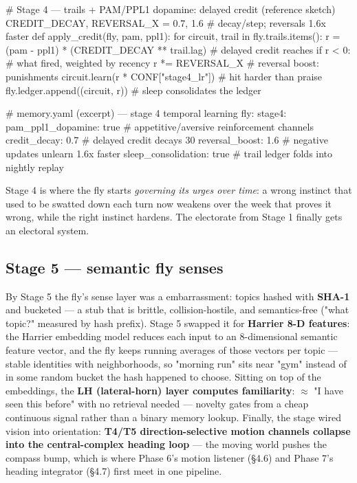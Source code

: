 \documentclass[11pt]{article}
\begin{document}
\begin{CodeBlock}
# Stage 4 — trails + PAM/PPL1 dopamine: delayed credit (reference sketch)
CREDIT_DECAY, REVERSAL_X = 0.7, 1.6       # decay/step; reversals 1.6x faster
def apply_credit(fly, pam, ppl1):
    for circuit, trail in fly.trails.items():
        r = (pam - ppl1) * (CREDIT_DECAY ** trail.lag)     # delayed credit reaches
        if r < 0:                                        # what fired, weighted by recency
            r *= REVERSAL_X                               # reversal boost: punishments
        circuit.learn(r * CONF["stage4_lr"])              # hit harder than praise
        fly.ledger.append((circuit, r))                   # sleep consolidates the ledger
\end{CodeBlock}

\begin{CodeBlock}
# memory.yaml (excerpt) — stage 4 temporal learning
fly:
  stage4:
    pam_ppl1_dopamine: true       # appetitive/aversive reinforcement channels
    credit_decay: 0.7             # delayed credit decays 30%
    reversal_boost: 1.6           # negative updates unlearn 1.6x faster
    sleep_consolidation: true     # trail ledger folds into nightly replay
\end{CodeBlock}

Stage 4 is where the fly starts \emph{governing its urges over time}: a wrong instinct that used to be swatted down each turn now weakens over the week that proves it wrong, while the right instinct hardens. The electorate from Stage 1 finally gets an electoral system.

\subsection{Stage 5 — semantic fly senses}

By Stage 5 the fly's sense layer was a embarrassment: topics hashed with \textbf{SHA-1} and bucketed — a stub that is brittle, collision-hostile, and semantics-free ("what topic?" measured by hash prefix). Stage 5 swapped it for \textbf{Harrier 8-D features}: the Harrier embedding model reduces each input to an 8-dimensional semantic feature vector, and the fly keeps running averages of those vectors per topic — stable identities with neighborhoods, so "morning run" sits near "gym" instead of in some random bucket the hash happened to choose. Sitting on top of the embeddings, the \textbf{LH (lateral-horn) layer computes familiarity}: \( \approx \) "I have seen this before" with no retrieval needed — novelty gates from a cheap continuous signal rather than a binary memory lookup. Finally, the stage wired vision into orientation: \textbf{T4/T5 direction-selective motion channels collapse into the central-complex heading loop} — the moving world pushes the compass bump, which is where Phase 6's motion listener (§4.6) and Phase 7's heading integrator (§4.7) first meet in one pipeline.
\end{document}
